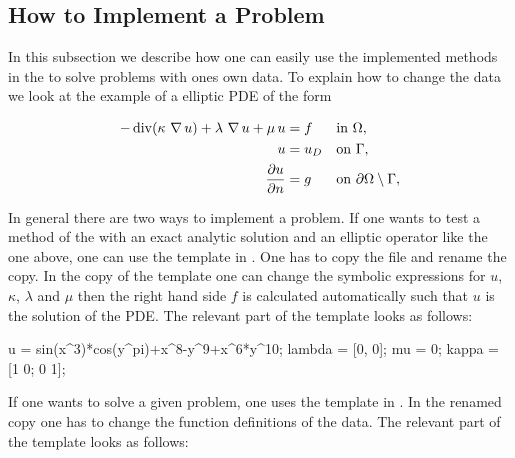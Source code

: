 \subsection{How to Implement a Problem}
\label{sect:QuickStart:howToOwnProblem}

In this subsection we describe how one can easily use the implemented methods in the \FFW to solve problems with ones own data. To explain how to change the data we look at the example of a elliptic PDE of the form

\begin{align*}
- \operatorname{div} (\kappa \,\operatorname{\nabla} u) + \lambda \,\operatorname{\nabla} u + \mu \, u &= f &&\text{in } \Omega,\\
u &= u_D &&\text{on } \Gamma,\\
\frac{\partial u}{\partial n} &= g &&\text{on } \partial\Omega \setminus \Gamma,
\end{align*}

In general there are two ways to implement a problem. If one wants to test a method of the \FFW with an exact analytic solution and an elliptic operator like the one above, one can use the template  in . One has to copy the file and rename the copy. In the copy of the template one can change the symbolic expressions for $u$, $\kappa$, $\lambda$ and $\mu$ then the right hand side $f$ is calculated automatically such that $u$ is the solution of the PDE. The relevant part of the template  looks as follows:

\begin{pcode}
u = sin(x^3)*cos(y^pi)+x^8-y^9+x^6*y^10;
lambda = [0, 0];
mu = 0;
kappa = [1 0; 0 1];
\end{pcode}

If one wants to solve a given problem, one uses the template  in . In the renamed copy one has to change the function definitions of the data. The relevant part of the template  looks as follows:

